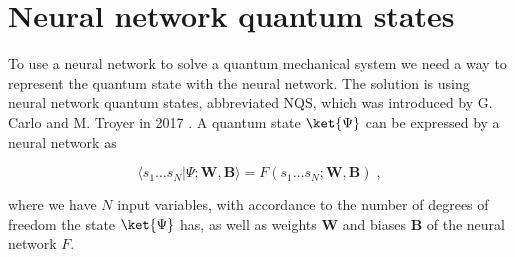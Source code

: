 \section{Neural network quantum states}

To use a neural network to solve a quantum mechanical system we need a way to represent the quantum state with the neural network. The solution is using neural network quantum states, abbreviated NQS, which was introduced by G. Carlo and M. Troyer in 2017 \cite{Carleo_2017}. A quantum state $\ket{\Psi}$ can be expressed by a neural network as

\begin{equation}
    \langle s_{1}\ldots s_{N}|\Psi ;\boldsymbol{W}, \boldsymbol{B}\rangle =F(s_{1}\ldots s_{N} ; \boldsymbol{W}, \boldsymbol{B} ) \; ,
\end{equation}

where we have $N$ input variables, with accordance to the number of degrees of freedom the state $\ket{\Psi}$ has, as well as weights $\boldsymbol{W}$ and biases $\boldsymbol{B}$ of the neural network $F$.